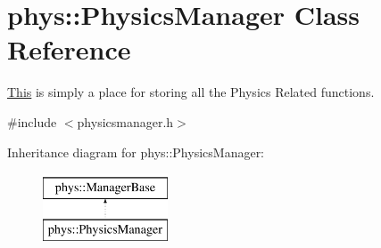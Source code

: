 \hypertarget{classphys_1_1PhysicsManager}{
\section{phys::PhysicsManager Class Reference}
\label{d3/dcc/classphys_1_1PhysicsManager}
}


\hyperlink{structThis}{This} is simply a place for storing all the Physics Related functions.  




{\ttfamily \#include $<$physicsmanager.h$>$}

Inheritance diagram for phys::PhysicsManager:\begin{figure}[H]
\begin{center}
\leavevmode
\includegraphics[height=2cm]{d3/dcc/classphys_1_1PhysicsManager}
\end{center}
\end{figure}
